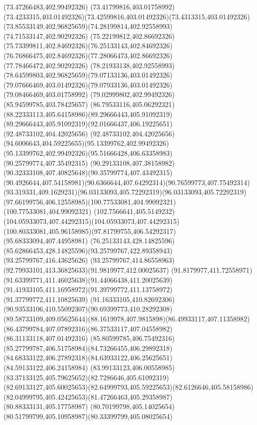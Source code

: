 {{\lineto(73.47266483,402.99492326)
\lineto(73.41799816,403.01758992)
\curveto(73.4233315,403.01492326)(73.42599816,403.01492326)(73.4313315,403.01492326)
\curveto(73.85533149,402.96825659)(74.28199814,402.92558993)(74.71533147,402.90292326)
\curveto(75.22199812,402.86692326)(75.73399811,402.84692326)(76.25133143,402.84692326)
\curveto(76.76866475,402.84692326)(77.28066473,402.86692326)(77.78466472,402.90292326)
\curveto(78.21933138,402.92558993)(78.64599803,402.96825659)(79.07133136,403.01492326)
\curveto(79.07666469,403.01492326)(79.07933136,403.01492326)(79.08466469,403.01758992)
\lineto(79.02999802,402.99492326)
\lineto(85.94599785,403.78425657)
\curveto(86.79533116,405.06292321)(88.22333113,405.64158986)(89.29666443,405.91092319)
\curveto(89.29666443,405.91092319)(92.01666437,406.19225651)(92.48733102,404.42025656)
\curveto(92.48733102,404.42025656)(94.6006643,404.59225655)(95.13399762,402.99492326)
\curveto(95.13399762,402.99492326)(95.51666428,406.63358983)(90.25799774,407.35492315)
\curveto(90.29133108,407.38158982)(90.32333108,407.40825648)(90.35799774,407.43492315)
\curveto(90.4926644,407.54158981)(90.6366644,407.64292314)(90.76599773,407.75492314)
\curveto(93.319331,409.1629231)(96.03133093,405.72292319)(96.03133093,405.72292319)
\curveto(97.66199756,406.12558985)(100.77533081,404.99092321)(100.77533081,404.99092321)
\curveto(102.7566641,405.5149232)(104.05933073,407.44292315)(104.05933073,407.44292315)
\curveto(100.80333081,405.96158985)(97.81799755,406.54292317)(95.68333094,407.44958981)
\moveto(76.25133143,428.14825596)
\curveto(85.62866453,428.14825596)(93.25799767,422.89358943)(93.25799767,416.43625626)
\curveto(93.25799767,414.86558963)(92.79933101,413.36825633)(91.9819977,412.00025637)
\curveto(91.8179977,411.72558971)(91.63399771,411.46025638)(91.44066438,411.20025639)
\curveto(91.41933105,411.16958972)(91.39799772,411.13758972)(91.37799772,411.10825639)
\curveto(91.16333105,410.82692306)(90.93533106,410.55092307)(90.69399773,410.28292308)
\curveto(89.58733109,409.05625644)(88.1619978,407.9815898)(86.49933117,407.11358982)
\curveto(86.43799784,407.07892316)(86.37533117,407.04558982)(86.31133118,407.01492316)
\curveto(85.80599785,406.75492316)(85.27799787,406.51758984)(84.73266455,406.29892318)
\curveto(84.68333122,406.27892318)(84.63933122,406.25625651)(84.59133122,406.24158984)
\curveto(83.99133123,406.00558985)(83.37133125,405.79625652)(82.7286646,405.61092319)
\curveto(82.69133127,405.60025653)(82.64999793,405.59225653)(82.6126646,405.58158986)
\curveto(82.04999795,405.42425653)(81.47266463,405.29358987)(80.88333131,405.17758987)
\curveto(80.70199798,405.14025654)(80.51799799,405.10958987)(80.33399799,405.08025654)
}}
